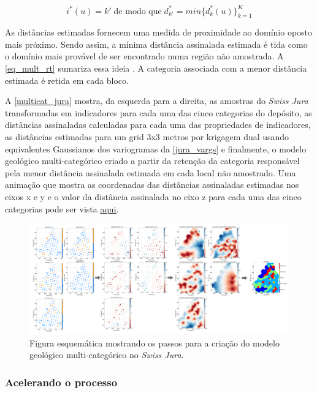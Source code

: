 \begin{equation}
	i^*(u)=k'\;\text{de modo que}\;d_{k'}^*=min\{d_k^*(u)\}_{k=1}^K
    \label{eq_mult_rt}
\end{equation}

As distâncias estimadas fornecem uma medida de proximidade ao domínio oposto mais próximo. Sendo assim, a mínima distância assinalada estimada é tida como o domínio mais provável de ser encontrado numa região não amostrada. A \autoref{eq_mult_rt} sumariza essa ideia \cite{silvaenhancedgeomodeling}. A categoria associada com a menor distância estimada é retida em cada bloco.

A \autoref{multicat_jura} mostra, da esquerda para a direita, as amostras do \textit{Swiss Jura} transformadas em indicadores para cada uma das cinco categorias do depósito, as distâncias assinaladas calculadas para cada uma das propriedades de indicadores, as distâncias estimadas para um grid 3x3 metros por krigagem dual usando equivalentes Gaussianos dos variogramas da \autoref{jura_vargs} e finalmente, o modelo geológico multi-categórico criado a partir da retenção da categoria responsável pela menor distância assinalada estimada em cada local não amostrado. Uma animação que mostra as coordenadas das distâncias assinaladas estimadas nos eixos x e y e o valor da distância assinalada no eixo z para cada uma das cinco categorias pode ser vista  \href{https://github.com/robertorolo/assessing_geological_model_uncertainty_with_probability_fields/blob/main/anim_multicat.gif}{aqui}.

\begin{figure}[H]
	\centering
	\caption{\label{multicat_jura}Figura esquemática mostrando os passos para a criação do modelo geológico multi-categórico no \textit{Swiss Jura}.}
	\includegraphics[width=\textwidth]{capitulo_2/imagens/multi category implicit modeling.png}
\end{figure}

\subsubsection{Acelerando o processo}

